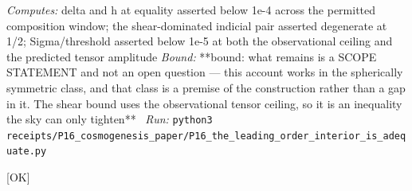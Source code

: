 \begin{description}
\emph{Computes:} delta and h at equality asserted below 1e-4 across the permitted composition window; the shear-dominated indicial pair asserted degenerate at 1/2; Sigma/threshold asserted below 1e-5 at both the observational ceiling and the predicted tensor amplitude
 \emph{Bound:} **bound: what remains is a SCOPE STATEMENT and not an open question --- this account works in the spherically symmetric class, and that class is a premise of the construction rather than a gap in it. The shear bound uses the observational tensor ceiling, so it is an inequality the sky can only tighten**
\ \emph{Run:} \texttt{python3 receipts/P16\_cosmogenesis\_paper/P16\_the\_leading\_order\_interior\_is\_adequate.py}
\item[\label{rcpt:P16_the_passage_is_phase_only_above_the_first_peak}\texttt{P16\_the\_passage\_is\_phase\_only\_above\_the\_first\_peak}]\hfill\textsf{[OK]}\\

\end{description}
